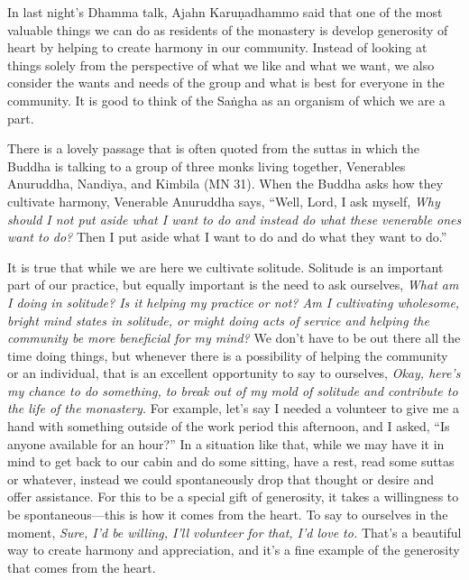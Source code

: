 
In last night's Dhamma talk, Ajahn Karuṇadhammo said that one of the 
most valuable things we can do as residents of the monastery is develop 
generosity of heart by helping to create harmony in our community. 
Instead of looking at things solely from the perspective of what we 
like and what we want, we also consider the wants and needs of the 
group and what is best for everyone in the community. It is good to 
think of the Saṅgha as an organism of which we are a part.

There is a lovely passage that is often quoted from the suttas in which 
the Buddha is talking to a group of three monks living together, 
Venerables Anuruddha, Nandiya, and Kimbila (MN 31). When the Buddha 
asks how they cultivate harmony, Venerable Anuruddha says, ``Well, 
Lord, I ask myself, \emph{Why should I not put aside what I want to do 
and instead do what these venerable ones want to do?} Then I put aside 
what I want to do and do what they want to do.''

It is true that while we are here we cultivate solitude. Solitude is an
important part of our practice, but equally important is the need to ask
ourselves, \emph{What am I doing in solitude? Is it helping my practice
or not? Am I cultivating wholesome, bright mind states in solitude, or
might doing acts of service and helping the community be more beneficial
for my mind?} We don't have to be out there all the time doing things,
but whenever there is a possibility of helping the community or an
individual, that is an \mbox{excellent} opportunity to say to ourselves,
\emph{Okay, here's my chance to do something, to break out of my mold of
solitude and contribute to the life of the monastery.} For example,
let's say I needed a volunteer to give me a hand with something outside
of the work period this afternoon, and I asked, ``Is anyone available
for an hour?'' In a situation like that, while we may have it in mind to
get back to our cabin and do some sitting, have a rest, read some suttas
or whatever, instead we could spontaneously drop that thought or desire
and offer assistance. For this to be a special gift of generosity, it
takes a willingness to be spontaneous---this is how it comes from the
heart. To say to ourselves in the moment, \emph{Sure, I'd be willing,
I'll volunteer for that, I'd love to.} That's a beautiful way to create
harmony and appreciation, and it's a fine example of the generosity that
comes from the heart.

